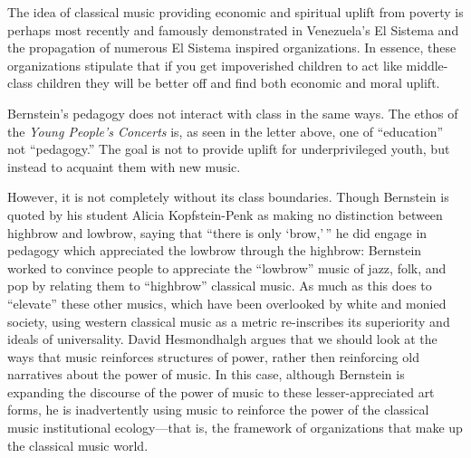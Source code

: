 \documentclass[12pt,letterpaper]{article}
\begin{document}
	The idea of classical music providing economic and spiritual uplift from
	poverty is perhaps most recently and famously demonstrated in 
	Venezuela's El Sistema and the propagation of numerous El Sistema 
	inspired organizations.  In essence, these organizations stipulate that
	if you get impoverished children to act like middle-class children they
	will be better off and find both economic and moral uplift.  

	Bernstein's pedagogy does not interact with class in the same ways. 
	The ethos of the \textit{Young People's Concerts} is, as seen in the
	letter above, one of ``education'' not ``pedagogy.'' 
	The goal is not to provide uplift for
	underprivileged youth, but instead to acquaint them with new music.   

	However, it is not completely without its class boundaries.
	Though Bernstein is quoted by
	his student Alicia Kopfstein-Penk as making no distinction between
	highbrow and lowbrow, saying that ``there is only 
	`brow,'\,''\autocite[xvi]{Kopfstein}  he did engage in pedagogy which
	appreciated the lowbrow through the highbrow: Bernstein worked to
	convince people to appreciate the ``lowbrow'' music of jazz, folk, and
	pop by relating them to ``highbrow'' classical 
	music.\autocite[63]{Kopfstein} As much as this does to ``elevate''
	these other musics, which have been overlooked by white and monied 
	society, using western classical music as a metric re-inscribes its
	superiority and ideals of universality.  
	David Hesmondhalgh argues that we should look at the ways that
	music reinforces structures of power, rather then reinforcing old 
	narratives about the power of music.\autocite[xiii]{Kopfstein} 
	In this case, although Bernstein is expanding the discourse of the power
	of music to these lesser-appreciated art forms, he is inadvertently 
	using
	music to reinforce the power of the classical music institutional 
	ecology---that is, the framework of organizations that make up the 
	classical music world.\autocite[27]{Bull}  
\end{document}
